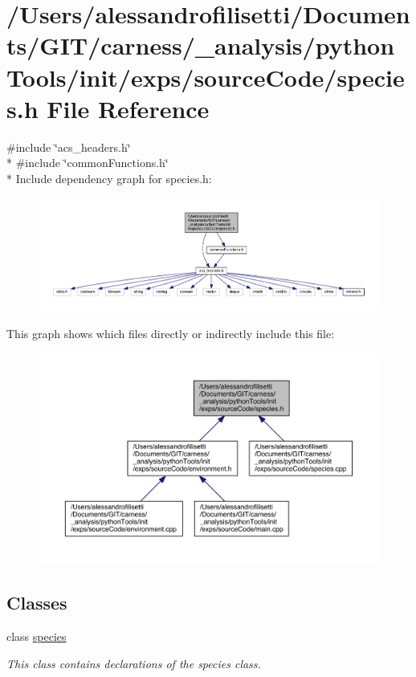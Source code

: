 \hypertarget{a00080}{\section{/\+Users/alessandrofilisetti/\+Documents/\+G\+I\+T/carness/\+\_\+analysis/python\+Tools/init/exps/source\+Code/species.h File Reference}
\label{a00080}
}
{\ttfamily \#include \char`\"{}acs\+\_\+headers.\+h\char`\"{}}\\*
{\ttfamily \#include \char`\"{}common\+Functions.\+h\char`\"{}}\\*
Include dependency graph for species.\+h\+:\nopagebreak
\begin{figure}[H]
\begin{center}
\leavevmode
\includegraphics[width=350pt]{a00204}
\end{center}
\end{figure}
This graph shows which files directly or indirectly include this file\+:\nopagebreak
\begin{figure}[H]
\begin{center}
\leavevmode
\includegraphics[width=350pt]{a00205}
\end{center}
\end{figure}
\subsection*{Classes}
\begin{DoxyCompactItemize}
\item 
class \hyperlink{a00021}{species}
\begin{DoxyCompactList}\small\item\em This class contains declarations of the species class. \end{DoxyCompactList}\end{DoxyCompactItemize}
